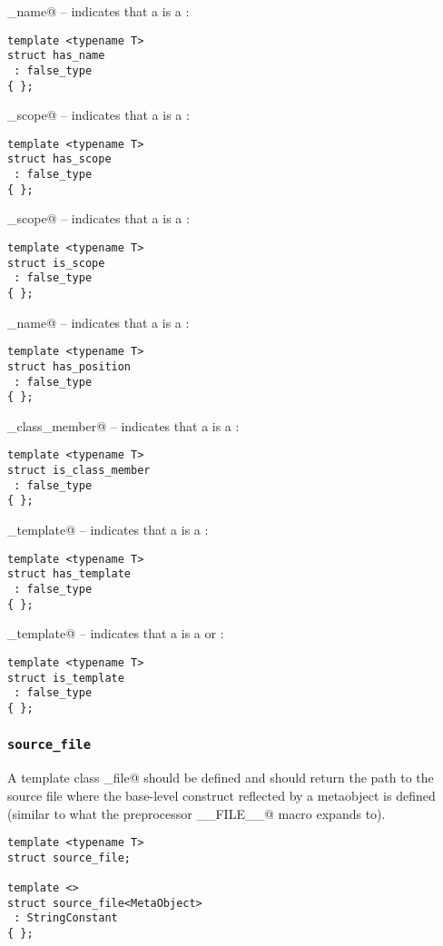 \verb@has_name@ -- indicates that a  is a :
\begin{verbatim}
template <typename T>
struct has_name
 : false_type
{ };
\end{verbatim}

\verb@has_scope@ -- indicates that a  is a :
\begin{verbatim}
template <typename T>
struct has_scope
 : false_type
{ };
\end{verbatim}

\verb@is_scope@ -- indicates that a  is a :
\begin{verbatim}
template <typename T>
struct is_scope
 : false_type
{ };
\end{verbatim}

\verb@has_name@ -- indicates that a  is a :
\begin{verbatim}
template <typename T>
struct has_position
 : false_type
{ };
\end{verbatim}

\verb@is_class_member@ -- indicates that a  is a :
\begin{verbatim}
template <typename T>
struct is_class_member
 : false_type
{ };
\end{verbatim}

\verb@has_template@ -- indicates that a  is a :
\begin{verbatim}
template <typename T>
struct has_template
 : false_type
{ };
\end{verbatim}

\verb@is_template@ -- indicates that a  is a 
or :
\begin{verbatim}
template <typename T>
struct is_template
 : false_type
{ };
\end{verbatim}

\subsubsection{\texttt{source\_file}}

A template class \verb@source_file@ should be defined and should return the
path to the source file where the base-level construct reflected by a
metaobject is defined (similar to what the preprocessor \verb@__FILE__@ macro
expands to).

\begin{verbatim}
template <typename T>
struct source_file;

template <>
struct source_file<MetaObject>
 : StringConstant
{ };
\end{verbatim}

